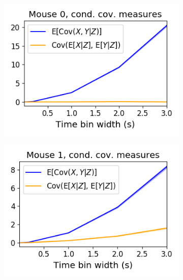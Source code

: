 \documentclass[a4paper,12pt]{article}
\theoremstyle{definition}
\begin{document}
  \begin{figure}[h]
    \begin{subfigure}[h]{0.5\linewidth}
      \includegraphics[width=\linewidth]{figures/Krebs_cond_cov_comparison.png}
      \label{fig:Krebs_cond_cov_comparison}
    \end{subfigure}
    \begin{subfigure}[h]{0.5\linewidth}
      \includegraphics[width=\linewidth]{figures/Waksman_cond_cov_comparison.png}
      \label{fig:Waksman_cond_cov_comparison}
    \end{subfigure}
    \begin{subfigure}[h]{0.5\linewidth}

\end{subfigure}
\end{figure}
\end{document}
